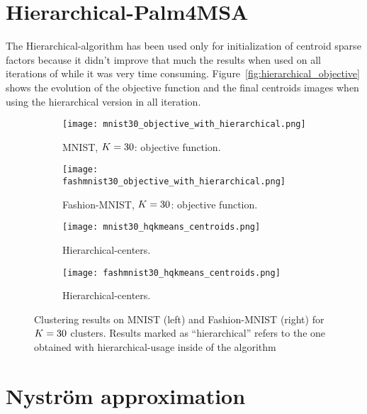 \section{Hierarchical-Palm4MSA}
\label{supp:hierarchical}

The Hierarchical-\palm algorithm has been used only for initialization of centroid sparse factors because it didn't improve that much the results when used on all iterations of  \qkmeans while it was very time consuming. Figure~\ref{fig:hierarchical_objective} shows the evolution of the objective function and the final centroids images when using the hierarchical version in all iteration.


\begin{figure*}[h]
\label{fig:hierarchical_objective}
\begin{subfigure}{.49\textwidth}
\texttt{[image: mnist30\_objective\_with\_hierarchical.png]}
\caption{MNIST, $K=30$: objective function.}
\label{fig:mnist:objfunhier}
\end{subfigure}
\begin{subfigure}{.49\textwidth}
\texttt{[image: fashmnist30\_objective\_with\_hierarchical.png]}
\caption{Fashion-MNIST, $K=30$: objective function.}
\label{fig:fmnist:objfunhier}
\end{subfigure}
\begin{subfigure}{.49\textwidth}
\texttt{[image: mnist30\_hqkmeans\_centroids.png]}
\caption{Hierarchical-\palm \qkmeans centers.}
\label{fig:mnist:hqkmeans:centers}
\end{subfigure}
\begin{subfigure}{.49\textwidth}
\texttt{[image: fashmnist30\_hqkmeans\_centroids.png]}
\caption{Hierarchical-\palm \qkmeans centers.}
\label{fig:fmnist:hqkmeans:centers}
\end{subfigure}
\caption{Clustering results on MNIST (left) and Fashion-MNIST (right) for $K=30$ clusters. Results marked as ``hierarchical'' refers to the one obtained with hierarchical-\palm usage inside of the  \qkmeans algorithm}
\end{figure*}

\FloatBarrier

\section{Nyström approximation}
\label{supp:nystrom}

